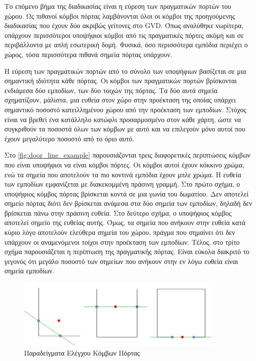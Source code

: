 Το επόμενο βήμα της διαδικασίας είναι η εύρεση των πραγματικών πορτών του χώρου. Ως πιθανοί κόμβοι πόρτας λαμβάνονται όλοι οι κόμβοι της προηγούμενης διαδικασίας που έχουν δύο ακριβώς γείτονες στο GVD. Όπως αναλύθηκε νωρίτερα, υπάρχουν περισσότεροι υποψήφιοι κόμβοι από τις πραγματικές πόρτες ακόμη και σε περιβάλλοντα με απλή εσωτερική δομή. Φυσικά, όσο περισσότερα εμπόδια περιέχει ο χώρος, τόσα περισσότερα πιθανά σημεία πόρτας υπάρχουν. 

Η εύρεση των πραγματικών πορτών από το σύνολο των υποψήφιων βασίζεται σε μια σημαντική ιδιότητα κάθε πόρτας. Οι κόμβοι των πραγματικών πορτών βρίσκονται ενδιάμεσα δύο εμποδίων, των δύο τοιχών της πόρτας. Τα δύο αυτά σημεία σχηματίζουν, μάλιστα, μια ευθεία στον χώρο στην προέκταση της οποίας υπάρχει σημαντικό ποσοστό κατειλλημένου χώρου από την προέκταση των εμποδίων. Στόχος είναι να βρεθεί ένα κατάλληλο κατώφλι προσαρμοσμένο στον κάθε χάρτη, ώστε να συγκριθούν τα ποσοστά όλων των κόμβων με αυτό και να επιλεγούν μόνο αυτοί που έχουν μεγαλύτερο ποσοστό από το όριο αυτό.

Στο \autoref{fig:door_line_example} παρουσιάζονται τρεις διαφορετικές περιπτώσεις κόμβων που είναι υποψήφιοι να είναι κόμβοι πόρτες. Οι κόμβοι αυτοί έχουν κόκκινο χρώμα, ενώ τα σημεία που αποτελούν τα πιο κοντινά εμπόδια έχουν μπλε χρώμα. Η ευθεία των εμποδίων εμφανίζεται με διακεκομμένη πράσινη γραμμή. Στο πρώτο σχήμα, ο υποψήφιος κόμβος πόρτας βρίσκεται κοντά σε μια γωνία του δωματίου. Δεν αποτελεί σημείο πόρτας διότι δεν βρίσκεται ανάμεσα στα δύο σημεία των εμποδίων, δηλαδή δεν βρίσκεται πάνω στην πράσινη ευθεία. Στο δεύτερο σχήμα, ο υποψήφιος κόμβος αποτελεί σημείο της ευθείας αυτής. Όμως, τα σημεία που ανήκουν στην ευθεία κατά κύριο λόγο αποτελούν ελεύθερα σημεία του χώρου, πράγμα που σημαίνει ότι δεν υπάρχουν οι αναμενόμενοι τοίχοι στην προέκταση των εμποδίων. Τέλος, στο τρίτο σχήμα παρουσιάζεται η περίπτωση της πραγματικής πόρτας. Είναι εύκολα διακριτό το γεγονός ότι μεγάλο ποσοστό των σημείων που ανήκουν στην εν λόγω ευθεία είναι σημεία εμποδίων.


\begin{figure}[!htb]
    \centering
    \includegraphics[width=0.9\textwidth]{./images/chapter5/door_line_example.png}
    \caption{Παραδείγματα Ελέγχου Κόμβων Πόρτας}
    \label{fig:door_line_example}
\end{figure}



